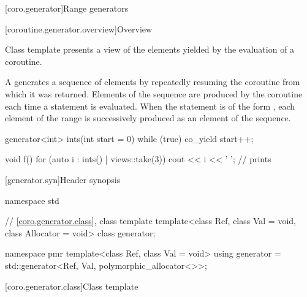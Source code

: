 [coro.generator]{Range generators}

[coroutine.generator.overview]{Overview}

\pnum
Class template  presents
a view of the elements yielded by the evaluation of a coroutine.

\pnum
A  generates a sequence of elements by
repeatedly resuming the coroutine from which it was returned.
Elements of the sequence are produced by the coroutine
each time a  statement is evaluated.
When the  statement is of the form
,
each element of the range 
is successively produced as an element of the sequence.
\begin{example}
\begin{codeblock}
generator<int> ints(int start = 0) {
  while (true)
    co_yield start++;
}

void f() {
  for (auto i : ints() | views::take(3))
    cout << i << ' ';       // prints 
}
\end{codeblock}
\end{example}

[generator.syn]{Header  synopsis}

%
\begin{codeblock}
namespace std {
  // \ref{coro.generator.class}, class template 
  template<class Ref, class Val = void, class Allocator = void>
    class generator;

  namespace pmr {
    template<class Ref, class Val = void>
      using generator = std::generator<Ref, Val, polymorphic_allocator<>>;
  }
}
\end{codeblock}

[coro.generator.class]{Class template }

